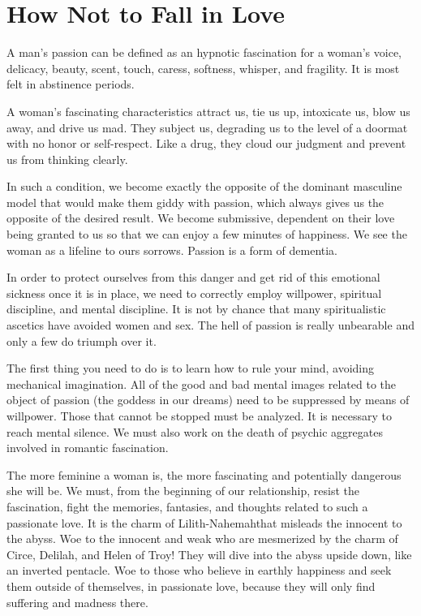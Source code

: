 \section{How Not to Fall in Love}

\par A man's passion can be defined as an hypnotic fascination for a woman's voice, delicacy, beauty, scent, touch, caress, softness, whisper, and fragility. It is most felt in abstinence periods.

\par A woman's fascinating characteristics attract us, tie us up, intoxicate us, blow us away, and drive us mad. They subject us, degrading us to the level of a doormat with no honor or self-respect. Like a drug, they cloud our judgment and prevent us from thinking clearly.

\par In such a condition, we become exactly the opposite of the dominant masculine model that would make them giddy with passion, which always gives us the opposite of the desired result. We become submissive, dependent on their love being granted to us so that we can enjoy a few minutes of happiness. We see the woman as a lifeline to ours sorrows. Passion is a form of dementia.

\par In order to protect ourselves from this danger and get rid of this emotional sickness once it is in place, we need to correctly employ willpower, spiritual discipline, and mental discipline. It is not by chance that many spiritualistic ascetics have avoided women and sex. The hell of passion is really unbearable and only a few do triumph over it.

\par The first thing you need to do is to learn how to rule your mind, avoiding mechanical imagination. All of the good and bad mental images related to the object of passion (the goddess in our dreams) need to be suppressed by means of willpower. Those that cannot be stopped must be analyzed. It is necessary to reach mental silence. We must also work on the death of psychic aggregates involved in romantic fascination.

\par The more feminine a woman is, the more fascinating and potentially dangerous she will be. We must, from the beginning of our relationship, resist the fascination, fight the memories, fantasies, and thoughts related to such a passionate love. It is the charm of Lilith-Nahemah\footnotemark[14] that misleads the innocent to the abyss. Woe to the innocent and weak who are mesmerized by the charm of Circe, Delilah, and Helen of Troy\footnotemark[15]! They will dive into the abyss upside down, like an inverted pentacle. Woe to those who believe in earthly happiness and seek them outside of themselves, in passionate love, because they will only find suffering and madness there.

